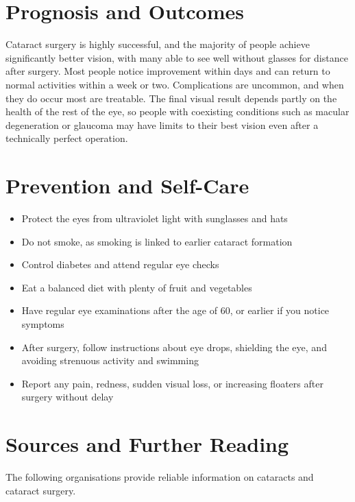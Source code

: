 \section*{Prognosis and Outcomes}
Cataract surgery is highly successful, and the majority of people achieve significantly better vision, with many able to see well without glasses for distance after surgery. Most people notice improvement within days and can return to normal activities within a week or two. Complications are uncommon, and when they do occur most are treatable. The final visual result depends partly on the health of the rest of the eye, so people with coexisting conditions such as macular degeneration or glaucoma may have limits to their best vision even after a technically perfect operation.

\section*{Prevention and Self-Care}
\begin{itemize}
    \item Protect the eyes from ultraviolet light with sunglasses and hats
    \item Do not smoke, as smoking is linked to earlier cataract formation
    \item Control diabetes and attend regular eye checks
    \item Eat a balanced diet with plenty of fruit and vegetables
    \item Have regular eye examinations after the age of 60, or earlier if you notice symptoms
    \item After surgery, follow instructions about eye drops, shielding the eye, and avoiding strenuous activity and swimming
    \item Report any pain, redness, sudden visual loss, or increasing floaters after surgery without delay
\end{itemize}

\section*{Sources and Further Reading}
The following organisations provide reliable information on cataracts and cataract surgery.

